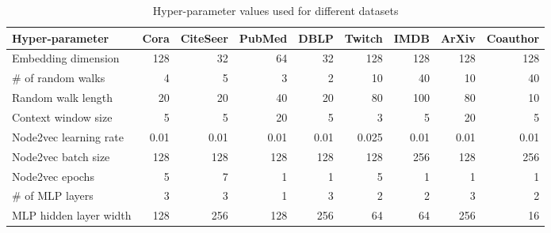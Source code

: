 \begin{table*}
  \caption{Hyper-parameter values used for different datasets}
  \label{tab:hyperparameter-values}
  \centering
  \begin{adjustbox}{max width=\textwidth}
    \begin{tabular}{lrrrrrrrr}
      \toprule
      \textbf{Hyper-parameter} & \textbf{Cora} & \textbf{CiteSeer} & \textbf{PubMed} & \textbf{DBLP} & \textbf{Twitch} & \textbf{IMDB} & \textbf{ArXiv} & \textbf{Coauthor} \\
      \midrule
      Embedding dimension      & 128           & 32                & 64              & 32            & 128             & 128           & 128            & 128               \\
      \# of random walks       & 4             & 5                 & 3               & 2             & 10              & 40            & 10             & 40                \\
      Random walk length       & 20            & 20                & 40              & 20            & 80              & 100           & 80             & 10                \\
      Context window size      & 5             & 5                 & 20              & 5             & 3               & 5             & 20             & 5                 \\
      Node2vec learning rate   & 0.01          & 0.01              & 0.01            & 0.01          & 0.025           & 0.01          & 0.01           & 0.01              \\
      Node2vec batch size      & 128           & 128               & 128             & 128           & 128             & 256           & 128            & 256               \\
      Node2vec epochs          & 5             & 7                 & 1               & 1             & 5               & 1             & 1              & 1                 \\
      \# of MLP layers         & 3             & 3                 & 1               & 3             & 2               & 2             & 3              & 2                 \\
      MLP hidden layer width   & 128           & 256               & 128             & 256           & 64              & 64            & 256            & 16                \\

\end{tabular}
\end{adjustbox}
\end{table*}
